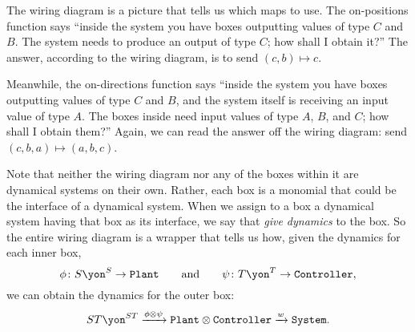 \documentclass[Book-Poly]{subfiles}
\begin{document}
\begin{example}
The wiring diagram is a picture that tells us which maps to use.
The on-positions function says ``inside the system you have boxes outputting values of type $C$ and $B$.
The system needs to produce an output of type $C$; how shall I obtain it?''
The answer, according to the wiring diagram, is to send $(c,b)\mapsto c$.

Meanwhile, the on-directions function says ``inside the system you have boxes outputting values of type $C$ and $B$, and the system itself is receiving an input value of type $A$.
The boxes inside need input values of type $A$, $B$, and $C$; how shall I obtain them?''
Again, we can read the answer off the wiring diagram: send $(c,b,a)\mapsto (a,b,c)$.

Note that neither the wiring diagram nor any of the boxes within it are dynamical systems on their own.
Rather, each box is a monomial that could be the interface of a dynamical system.
When we assign to a box a dynamical system having that box as its interface, we say that \emph{give dynamics} to the box.
So the entire wiring diagram is a wrapper that tells us how, given the dynamics for each inner box,
\[
\phi\colon S\yon^S\to\const{Plant}
\qqand
\psi\colon T\yon^T\to\const{Controller},
\]
we can obtain the dynamics for the outer box:
\[
ST\yon^{ST}\To{\phi\otimes\psi}\const{Plant}\otimes\const{Controller}\To{w}\const{System}.
\]
\end{example}
\end{document}
